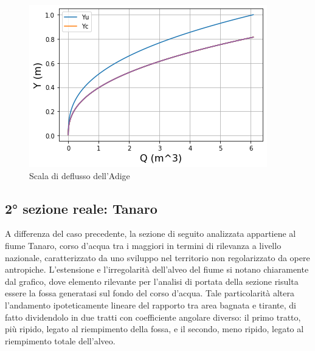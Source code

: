\documentclass[12pt]{article} %
\begin{document}
\begin{figure} [H]
    \centering
    \includegraphics[scale=0.8]{deflussotri.png}
    \caption{Scala di deflusso dell'Adige}
    \label{fig:Adige_scala_deflusso}
\end{figure}

\subsection{2° sezione reale: Tanaro}

\noindent A differenza del caso precedente, la sezione di seguito analizzata appartiene al fiume Tanaro, corso d’acqua tra i maggiori in termini di rilevanza a livello nazionale, caratterizzato da uno sviluppo nel territorio non regolarizzato da opere antropiche.
L’estensione e l’irregolarità dell’alveo del fiume si notano chiaramente dal grafico, dove elemento rilevante per l’analisi di portata della sezione risulta essere la fossa generatasi sul fondo del corso d’acqua. Tale particolarità altera l’andamento ipoteticamente lineare del rapporto tra area bagnata e tirante, di fatto dividendolo in due tratti con coefficiente angolare diverso: il primo tratto, più ripido, legato al riempimento della fossa, e il secondo, meno ripido, legato al riempimento totale dell’alveo.
\end{document}
